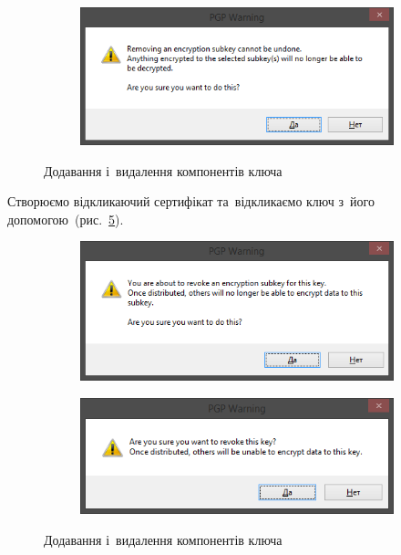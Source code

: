 \documentclass[
	a4paper,
	oneside,
	BCOR = 10mm,
	DIV = 12,
	12pt,
	headings = normal,
]{scrartcl}
\newlength{\gridunitwidth}
\begin{document}
\begin{figure}[!htbp]
\begin{subfigure}[b]{9 \gridunitwidth - 1em / (2-1)}
				\includegraphics[width = \columnwidth]{./assets/p22.png}
				\caption{}
				\label{subfig:remove-subkey}
			\end{subfigure}
			\caption{Додавання і~видалення компонентів ключа}
			\label{fig:add-key-components}
		\end{figure}

		Створюємо відкликаючий сертифікат та~відкликаємо ключ з~його допомогою~(рис.~\ref{fig:revocation}).

		\begin{figure}[!htbp]
			\centering
			\begin{subfigure}[b]{8 \gridunitwidth - 1em / (2-1)}
				\includegraphics[width = \columnwidth]{./assets/p23.png}
				\caption{}
				\label{subfig:revoke-subkey}
			\end{subfigure}
			\begin{subfigure}[b]{8 \gridunitwidth - 1em / (2-1)}
				\includegraphics[width = \columnwidth]{./assets/p24.png}
				\caption{}
				\label{subfig:revoke-key}
			\end{subfigure}
			\caption{Додавання і~видалення компонентів ключа}
			\label{fig:revocation}
		\end{figure}
\end{document}
